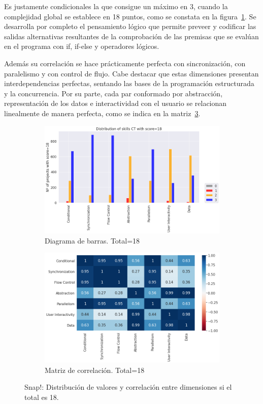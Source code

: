 \documentclass[a4paper, 12pt]{book}
\begin{document}
Es justamente condicionales la que consigue un máximo en 3, cuando la complejidad global se establece en 18 puntos, como se constata en la figura~\ref{fig:total18_Snap}. Se desarrolla por completo el pensamiento lógico que permite preveer y codificar las salidas alternativas resultantes de la comprobación de las premisas que se evalúan en el programa con if, if-else y operadores lógicos. 

Además su correlación se hace prácticamente perfecta con sincronización, con paralelismo y con control de flujo. Cabe destacar que estas dimensiones presentan interdependencias perfectas, sentando las bases de la programación estructurada y la concurrencia. Por su parte, cada par conformado por abstracción, representación de los datos e interactividad con el usuario se relacionan linealmente de manera perfecta, como se indica en la matriz~\ref{fig:corr18_Snap}.

\begin{figure}[H]
    \centering
    \begin{subfigure}[h]{.49\textwidth} 
        \includegraphics[width=\textwidth]{img/distribucion_18_Snap}
        \caption{Diagrama de barras. Total=18}
        \label{fig:total18_Snap}
    \end{subfigure}       
    \begin{subfigure}[h]{.49\textwidth} 
        \includegraphics[width=\textwidth]{img/corr_18_Snap}
        \caption{Matriz de correlación. Total=18}
        \label{fig:corr18_Snap}
    \end{subfigure}
    \caption{Snap!: Distribución de valores y correlación entre dimensiones si el total es 18.}
\end{figure}
\end{document}
